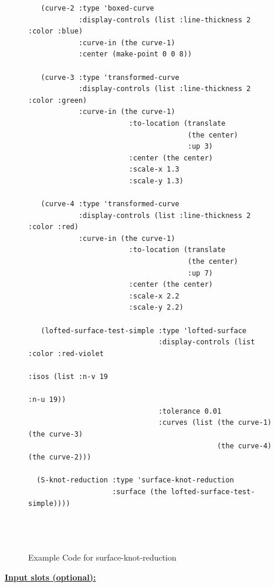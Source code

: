 \documentclass [11pt]{book}
\begin{document}
\begin{itemize}
\begin{figure}
\begin{lrbox}{\boxedverb}
\begin{minipage}{\linewidth}
{\begin{verbatim}
   (curve-2 :type 'boxed-curve 
            :display-controls (list :line-thickness 2 :color :blue)
            :curve-in (the curve-1)
            :center (make-point 0 0 8))

   (curve-3 :type 'transformed-curve
            :display-controls (list :line-thickness 2 :color :green)
            :curve-in (the curve-1)
                        :to-location (translate 
                                      (the center) 
                                      :up 3)
                        :center (the center)
                        :scale-x 1.3
                        :scale-y 1.3)
   
   (curve-4 :type 'transformed-curve
            :display-controls (list :line-thickness 2 :color :red)
            :curve-in (the curve-1)
                        :to-location (translate 
                                      (the center) 
                                      :up 7)
                        :center (the center)
                        :scale-x 2.2
                        :scale-y 2.2)
  
   (lofted-surface-test-simple :type 'lofted-surface
                               :display-controls (list :color :red-violet 
                                                       :isos (list :n-v 19 
                                                                   :n-u 19))
                               :tolerance 0.01
                               :curves (list (the curve-1) (the curve-3)
                                             (the curve-4) (the curve-2)))  

  (S-knot-reduction :type 'surface-knot-reduction
                    :surface (the lofted-surface-test-simple))))


 
\end{verbatim}}
\end{minipage}
\end{lrbox}
\fbox{\usebox{\boxedverb}}

\caption{Example Code for surface-knot-reduction}

\label{fig:example-code-surface-knot-reduction}

\end{figure}





\textbf{
\underline{Input slots (optional):}}

\begin{description}


\end{description}
\end{itemize}
\end{document}
